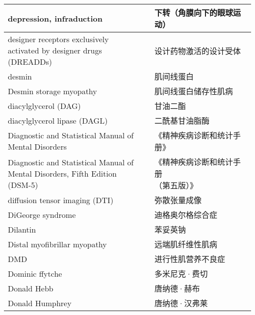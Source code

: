 \begin{longtable}{lll}
	\midrule
	depression, infraduction     &&  下转（角膜向下的眼球运动）  \\
	
	\midrule
	\makecell[l]{designer receptors exclusively\\ activated by designer drugs (DREADDs)}    &&  设计药物激活的设计受体  \\
	
	\midrule
	desmin   &&  肌间线蛋白  \\
	
	\midrule
	Desmin storage myopathy   &&  肌间线蛋白储存性肌病  \\
	
	\midrule
	diacylglycerol  (DAG)   &&  甘油二酯  \\
	
	\midrule
	diacylglycerol lipase  (DAGL)   &&  二酰基甘油脂酶  \\
	
	\midrule
	\makecell[l]{Diagnostic and Statistical Manual of \\Mental Disorders}     &&  《精神疾病诊断和统计手册》  \\
	
	\midrule
	\makecell[l]{Diagnostic and Statistical Manual of \\Mental Disorders, Fifth Edition (DSM-5)}     &&  \makecell[l]{《精神疾病诊断和统计手册\\（第五版）》}  \\
	
	\midrule
	diffusion tensor imaging (DTI)    &&  弥散张量成像  \\
	
	\midrule
	DiGeorge syndrome    &&  迪格奥尔格综合症  \\
	
	\midrule
	Dilantin    &&  苯妥英钠  \\
	
	\midrule
	Distal myofibrillar myopathy    &&  远端肌纤维性肌病  \\
	
	\midrule
	DMD    &&  进行性肌营养不良症  \\
	
	\midrule
	Dominic ffytche    &&  多米尼克·费切  \\
	
	\midrule
	Donald Hebb    &&  唐纳德·赫布  \\
	
	\midrule
	Donald Humphrey    &&  唐纳德·汉弗莱  \\
	

\end{longtable}
